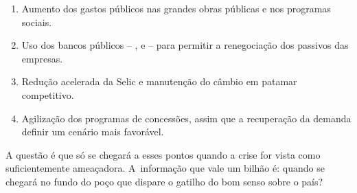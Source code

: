 \begin{enumerate}
\itemsep1pt\parskip0pt
\item
  Aumento dos gastos públicos nas grandes obras públicas e nos programas
  sociais.
\item
  Uso dos bancos públicos -- ,  e  -- para permitir a
  renegociação dos passivos das empresas.
\item
  Redução acelerada da Selic e manutenção do câmbio em patamar
  competitivo.
\item
  Agilização dos programas de concessões, assim que a recuperação da
  demanda definir um cenário mais favorável.
\end{enumerate}

A questão é que só se chegará a esses pontos quando a crise for vista
como suficientemente ameaçadora. A~informação que vale um bilhão é:
quando se chegará no fundo do poço que dispare o gatilho do bom senso
sobre o país?
